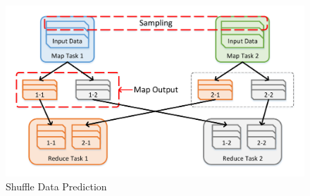 \begin{figure}
	\centering
	\includegraphics[width=\linewidth]{fig/shuffle}
	\caption{Shuffle Data Prediction}
	\label{fig:shuffle}
\end{figure}

